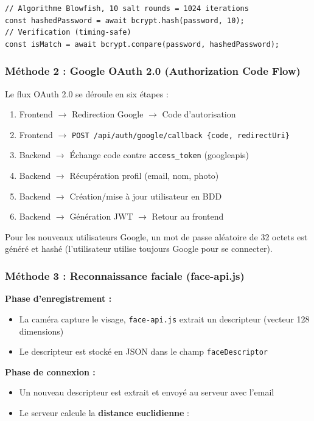\begin{verbatim}
// Algorithme Blowfish, 10 salt rounds = 1024 iterations
const hashedPassword = await bcrypt.hash(password, 10);
// Verification (timing-safe)
const isMatch = await bcrypt.compare(password, hashedPassword);
\end{verbatim}

\subsubsection{Méthode 2 : Google OAuth 2.0 (Authorization Code Flow)}

Le flux OAuth 2.0 se déroule en six étapes :

\begin{enumerate}
    \item Frontend $\rightarrow$ Redirection Google $\rightarrow$ Code d'autorisation
    \item Frontend $\rightarrow$ \texttt{POST /api/auth/google/callback \{code, redirectUri\}}
    \item Backend $\rightarrow$ Échange code contre \texttt{access\_token} (googleapis)
    \item Backend $\rightarrow$ Récupération profil (email, nom, photo)
    \item Backend $\rightarrow$ Création/mise à jour utilisateur en BDD
    \item Backend $\rightarrow$ Génération JWT $\rightarrow$ Retour au frontend
\end{enumerate}

Pour les nouveaux utilisateurs Google, un mot de passe aléatoire de 32 octets est généré et hashé (l'utilisateur utilise toujours Google pour se connecter).

\subsubsection{Méthode 3 : Reconnaissance faciale (face-api.js)}

\textbf{Phase d'enregistrement :}
\begin{itemize}
    \item La caméra capture le visage, \texttt{face-api.js} extrait un descripteur (vecteur 128 dimensions)
    \item Le descripteur est stocké en JSON dans le champ \texttt{faceDescriptor}
\end{itemize}

\textbf{Phase de connexion :}
\begin{itemize}
    \item Un nouveau descripteur est extrait et envoyé au serveur avec l'email
    \item Le serveur calcule la \textbf{distance euclidienne} :
\end{itemize}

